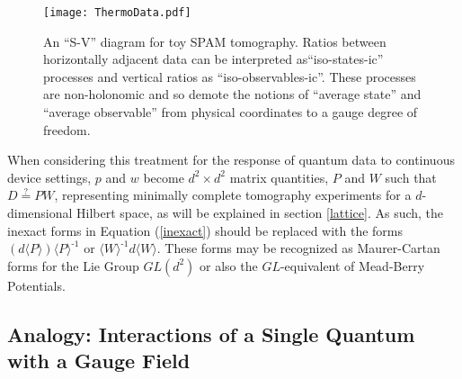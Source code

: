 \documentclass[pra, 10pt, notitlepage, twocolumn]{revtex4-1}
\newcommand{\inv}{\text{-1}}
\newcommand{\pref}[1]{(\ref{#1})}
\begin{document}
\begin{figure}[h!]
\centering
\texttt{[image: ThermoData.pdf]}
\caption{An ``S-V'' diagram for toy SPAM tomography. Ratios between horizontally adjacent data can be interpreted as``iso-states-ic'' processes and vertical ratios as ``iso-observables-ic''.  These processes are non-holonomic and so demote the notions of ``average state'' and ``average observable'' from physical coordinates to a gauge degree of freedom.}\label{ThermDat}
\end{figure}


When considering this treatment for the response of quantum data to continuous device settings,
$p$ and $w$ become $d^2 \times d^2$ matrix quantities, $P$ and $W$ such that $D\stackrel{?}=PW$, representing minimally complete tomography experiments for a $d$-dimensional Hilbert space,
as will be explained in section \ref{lattice}.
As such, the inexact forms in Equation \pref{inexact} should be replaced with the forms $(d\langle P \rangle)\langle P \rangle^\inv$ or $\langle W \rangle^\inv d\langle W \rangle$.
These forms may be recognized as Maurer-Cartan forms for the Lie Group $GL(d^2)$ or also the $GL$-equivalent of Mead-Berry Potentials.



\subsection{Analogy: Interactions of a Single Quantum with a Gauge Field}\label{Wilson}
\end{document}
